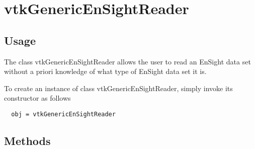 \section{vtkGenericEnSightReader}

\subsection{Usage}

 The class vtkGenericEnSightReader allows the user to read an EnSight data
 set without a priori knowledge of what type of EnSight data set it is.

To create an instance of class vtkGenericEnSightReader, simply
invoke its constructor as follows
\begin{verbatim}
  obj = vtkGenericEnSightReader
\end{verbatim}
\subsection{Methods}

